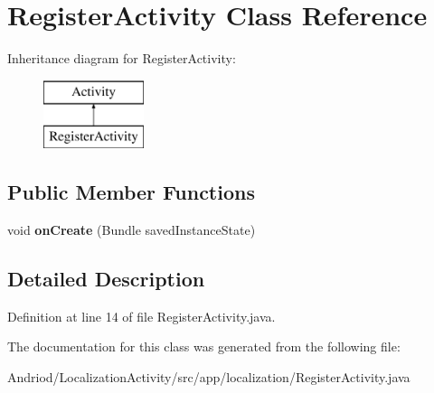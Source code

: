 \hypertarget{classapp_1_1localization_1_1_register_activity}{\section{Register\-Activity Class Reference}
\label{classapp_1_1localization_1_1_register_activity}
}
Inheritance diagram for Register\-Activity\-:\begin{figure}[H]
\begin{center}
\leavevmode
\includegraphics[height=2.000000cm]{classapp_1_1localization_1_1_register_activity}
\end{center}
\end{figure}
\subsection*{Public Member Functions}
\begin{DoxyCompactItemize}
\item 
\hypertarget{classapp_1_1localization_1_1_register_activity_a85e87cb5ced88dff7c8173ecc4f636d1}{void {\bfseries on\-Create} (Bundle saved\-Instance\-State)}\label{classapp_1_1localization_1_1_register_activity_a85e87cb5ced88dff7c8173ecc4f636d1}

\end{DoxyCompactItemize}


\subsection{Detailed Description}


Definition at line 14 of file Register\-Activity.\-java.



The documentation for this class was generated from the following file\-:\begin{DoxyCompactItemize}
\item 
Andriod/\-Localization\-Activity/src/app/localization/Register\-Activity.\-java\end{DoxyCompactItemize}
